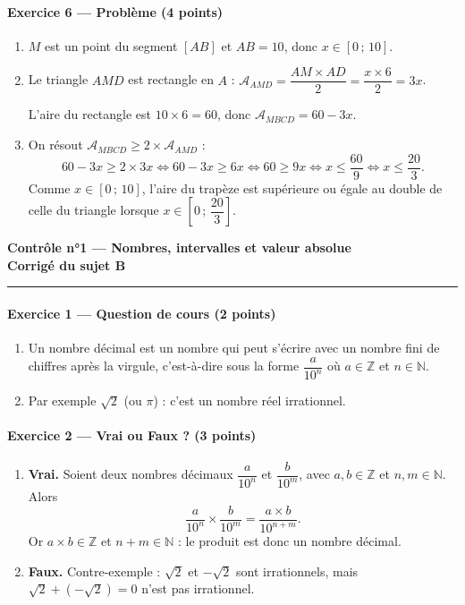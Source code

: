 \documentclass[11pt,a4paper]{article}
\newcommand{\N}{\mathbb{N}}
\newcommand{\Z}{\mathbb{Z}}
\renewcommand{\iff}{\Longleftrightarrow}
\newcommand{\exo}[3]{\paragraph{Exercice #1 --- #2 \hfill\normalfont\small(#3 points)}}
\newcommand{\rep}[1]{\textbf{#1}}
\newcommand{\entete}[1]{%
  \begin{center}
    {\Large\bfseries Contrôle n°1 --- Nombres, intervalles et valeur absolue}\\[0.4em]
    {\large\bfseries Corrigé du sujet #1}
  \end{center}
  \vspace{0.2em}
  \hrule
  \vspace{0.3em}
}
\begin{document}
\exo{6}{Problème}{4}
\begin{enumerate}[leftmargin=1.6em, itemsep=0.4em, topsep=0.2em]
  \item[\rep{1.}] $M$ est un point du segment $[AB]$ et $AB = 10$, donc $x \in [0\,;\,10]$.
  \item[\rep{2.}] Le triangle $AMD$ est rectangle en $A$ :
  $\mathcal{A}_{AMD} = \dfrac{AM \times AD}{2} = \dfrac{x \times 6}{2} = 3x$.

  L'aire du rectangle est $10 \times 6 = 60$, donc $\mathcal{A}_{MBCD} = 60 - 3x$.
  \item[\rep{3.}] On résout $\mathcal{A}_{MBCD} \geqslant 2 \times \mathcal{A}_{AMD}$ :
  \[ 60 - 3x \geqslant 2 \times 3x \iff 60 - 3x \geqslant 6x \iff 60 \geqslant 9x \iff x \leqslant \dfrac{60}{9} \iff x \leqslant \dfrac{20}{3}. \]
  Comme $x \in [0\,;\,10]$, l'aire du trapèze est supérieure ou égale au double de celle du triangle lorsque $x \in \left[0\,;\,\dfrac{20}{3}\right]$.
\end{enumerate}

\newpage
\entete{B}

\exo{1}{Question de cours}{2}
\begin{enumerate}[label=\alph*), itemsep=0.2em, topsep=0.2em]
  \item Un nombre décimal est un nombre qui peut s'écrire avec un nombre fini de chiffres après la virgule, c'est-à-dire sous la forme $\dfrac{a}{10^n}$ où $a \in \Z$ et $n \in \N$.
  \item Par exemple $\sqrt{2}$ (ou $\pi$) : c'est un nombre réel irrationnel.
\end{enumerate}

\exo{2}{Vrai ou Faux ?}{3}
\begin{enumerate}[label=\alph*), itemsep=0.4em, topsep=0.2em]
  \item \rep{Vrai.} Soient deux nombres décimaux $\dfrac{a}{10^n}$ et $\dfrac{b}{10^m}$, avec $a, b \in \Z$ et $n, m \in \N$. Alors
  \[ \dfrac{a}{10^n} \times \dfrac{b}{10^m} = \dfrac{a \times b}{10^{n+m}}. \]
  Or $a \times b \in \Z$ et $n + m \in \N$ : le produit est donc un nombre décimal.
  \item \rep{Faux.} Contre-exemple : $\sqrt{2}$ et $-\sqrt{2}$ sont irrationnels, mais $\sqrt{2} + \left(-\sqrt{2}\right) = 0$ n'est pas irrationnel.
\end{enumerate}
\end{document}
